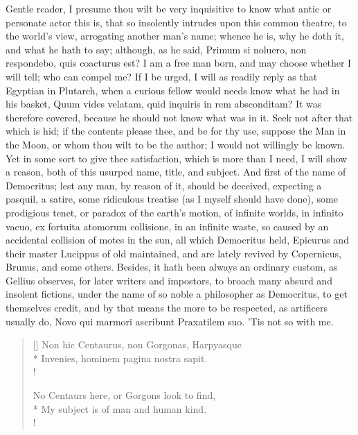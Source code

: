 {Gentle reader, I presume thou wilt be very inquisitive to know what
antic or personate actor this is, that so insolently intrudes upon this
common theatre, to the world's view, arrogating another man's name;
whence he is, why he doth it, and what he hath to say; although, as
he said, Primum si noluero, non respondebo, quis coacturus est? I am
a free man born, and may choose whether I will tell; who can compel me?
If I be urged, I will as readily reply as that Egyptian in Plutarch,
when a curious fellow would needs know what he had in his basket, Quum
vides velatam, quid inquiris in rem absconditam? It was therefore
covered, because he should not know what was in it. Seek not after that
which is hid; if the contents please thee, and be for thy use,
suppose the Man in the Moon, or whom thou wilt to be the author; I
would not willingly be known. Yet in some sort to give thee
satisfaction, which is more than I need, I will show a reason, both of
this usurped name, title, and subject. And first of the name of
Democritus; lest any man, by reason of it, should be deceived,
expecting a pasquil, a satire, some ridiculous treatise (as I myself
should have done), some prodigious tenet, or paradox of the earth's
motion, of infinite worlds, in infinito vacuo, ex fortuita atomorum
collisione, in an infinite waste, so caused by an accidental collision
of motes in the sun, all which Democritus held, Epicurus and their
master Lucippus of old maintained, and are lately revived by
Copernicus, Brunus, and some others. Besides, it hath been always an
ordinary custom, as Gellius observes, for later writers and
impostors, to broach many absurd and insolent fictions, under the name
of so noble a philosopher as Democritus, to get themselves credit, and
by that means the more to be respected, as artificers usually do, Novo
qui marmori ascribunt Praxatilem suo. 'Tis not so with me.

\settowidth{\versewidth}{Non hic Centaurus, non Gorgonas, Harpyasque}
\begin{verse}[\versewidth]
Non hic Centaurus, non Gorgonas, Harpyasque\\*
Invenies, hominem pagina nostra sapit.\\!

No Centaurs here, or Gorgons look to find,\\*
My subject is of man and human kind.\\!
\end{verse}

}
